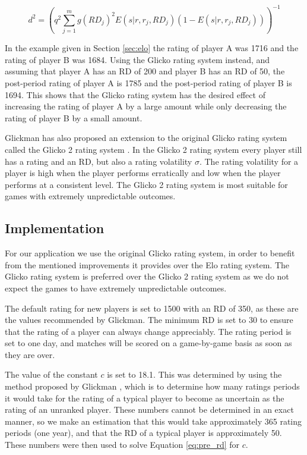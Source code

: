 \begin{equation} \label{eq:glicko_d2}
d^2 = \left( q^2 \sum \limits_{j=1}^m g \left( RD_j \right)^2 E \left( s | r, r_j, RD_j \right) \left( 1 - E \left( s | r, r_j, RD_j \right) \right) \right)^{-1}
\end{equation}

In the example given in Section \ref{sec:elo} the rating of player A was 1716 and the rating of player B was 1684.
Using the Glicko rating system instead, and assuming that player A has an RD of 200 and player B has an RD of 50, the post-period rating of player A is 1785 and the post-period rating of player B is 1694.
This shows that the Glicko rating system has the desired effect of increasing the rating of player A by a large amount while only decreasing the rating of player B by a small amount.

Glickman has also proposed an extension to the original Glicko rating system called the Glicko 2 rating system \cite{glicko2}.
In the Glicko 2 rating system every player still has a rating and an RD, but also a rating volatility $\sigma$.
The rating volatility for a player is high when the player performs erratically and low when the player performs at a consistent level.
The Glicko 2 rating system is most suitable for games with extremely unpredictable outcomes.

\subsection{Implementation}
For our application we use the original Glicko rating system, in order to benefit from the mentioned improvements it provides over the Elo rating system.
The Glicko rating system is preferred over the Glicko 2 rating system as we do not expect the games to have extremely unpredictable outcomes.

The default rating for new players is set to 1500 with an RD of 350, as these are the values recommended by Glickman.
The minimum RD is set to 30 to ensure that the rating of a player can always change appreciably.
The rating period is set to one day, and matches will be scored on a game-by-game basis as soon as they are over.

The value of the constant $c$ is set to 18.1.
This was determined by using the method proposed by Glickman \cite{glicko}, which is to determine how many ratings periods it would take for the rating of a typical player to become as uncertain as the rating of an unranked player.
These numbers cannot be determined in an exact manner, so we make an estimation that this would take approximately 365 rating periods (one year), and that the RD of a typical player is approximately 50.
These numbers were then used to solve Equation \ref{eq:pre_rd} for $c$.

